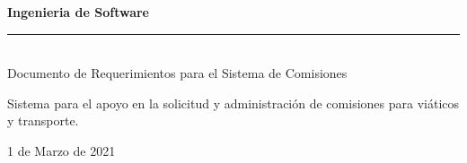 \begin{titlepage}
\begin{center}
	   \vspace{1cm} %


	   \vspace{1cm} %

	   \large \textbf{Ingenieria de Software}\\%
	   \rule{9.5cm}{3pt} %
	   \large{\\Documento de Requerimientos para el Sistema de Comisiones} %

	   \vspace{1cm} %

	  
	   Sistema para el apoyo en la solicitud y administración de comisiones para viáticos y transporte.
	   
	   \vspace{1cm} %

	 
	   \vspace{1cm} %

		1 de Marzo de 2021

    \end{center}

\end{titlepage}
